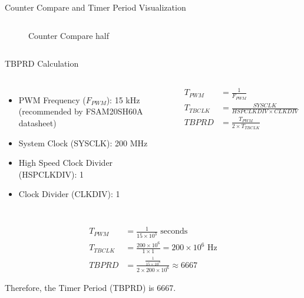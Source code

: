 \begin{frame}{Counter Compare and Timer Period Visualization}
\begin{columns}
\begin{figure}
		\caption{Counter Compare half}
	  \end{figure}
	\end{columns}
  \end{frame}

\begin{frame}{TBPRD Calculation}

	\begin{columns}[T]
		\begin{itemize}
			\item PWM Frequency ($F_{PWM}$): 15 kHz (recommended by FSAM20SH60A datasheet)
			\item System Clock (SYSCLK): 200 MHz
			\item High Speed Clock Divider (HSPCLKDIV): 1
			\item Clock Divider (CLKDIV): 1
		\end{itemize}
		\begin{align*}
			T_{PWM}   & = \frac{1}{F_{PWM}}                      \\
			T_{TBCLK} & = \frac{SYSCLK}{HSPCLKDIV \times CLKDIV} \\
			TBPRD     & = \frac{T_{PWM}}{2 \times T_{TBCLK}}
		\end{align*}
	\end{columns}

	\vspace{0.5cm}

	\begin{align*}
		T_{PWM}   & = \frac{1}{15 \times 10^3} \text{ seconds}                               \\
		T_{TBCLK} & = \frac{200 \times 10^6}{1 \times 1} = 200 \times 10^6 \text{ Hz}        \\
		TBPRD     & = \frac{\frac{1}{15 \times 10^3}}{2 \times 200 \times 10^6} \approx 6667
	\end{align*}

	\tiny{Therefore, the Timer Period (TBPRD) is 6667.}
\end{frame}


